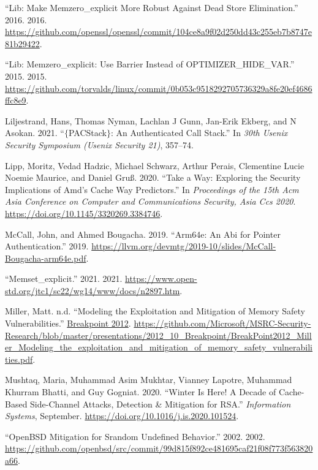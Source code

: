 \documentclass[a4paper,]{report}
\begin{document}
\leavevmode\hypertarget{ref-OpenSSLMemClr}{}%
``Lib: Make Memzero\_explicit More Robust Against Dead Store
Elimination.'' 2016. 2016.
\url{https://github.com/openssl/openssl/commit/104ce8a9f02d250dd43c255eb7b8747e81b29422}.

\leavevmode\hypertarget{ref-MemZeroBarrier}{}%
``Lib: Memzero\_explicit: Use Barrier Instead of OPTIMIZER\_HIDE\_VAR.''
2015. 2015.
\url{https://github.com/torvalds/linux/commit/0b053c9518292705736329a8fe20ef4686ffc8e9}.

\leavevmode\hypertarget{ref-Liljestrand2021}{}%
Liljestrand, Hans, Thomas Nyman, Lachlan J Gunn, Jan-Erik Ekberg, and N
Asokan. 2021. ``\(\{\)PACStack\(\}\): An Authenticated Call Stack.'' In
\emph{30th Usenix Security Symposium (Usenix Security 21)}, 357--74.

\leavevmode\hypertarget{ref-Lipp2020}{}%
Lipp, Moritz, Vedad Hadzic, Michael Schwarz, Arthur Perais, Clementine
Lucie Noemie Maurice, and Daniel Gruß. 2020. ``Take a Way: Exploring the
Security Implications of Amd's Cache Way Predictors.'' In
\emph{Proceedings of the 15th Acm Asia Conference on Computer and
Communications Security, Asia Ccs 2020}.
\url{https://doi.org/10.1145/3320269.3384746}.

\leavevmode\hypertarget{ref-McCall2019}{}%
McCall, John, and Ahmed Bougacha. 2019. ``Arm64e: An Abi for Pointer
Authentication.'' 2019.
\url{https://llvm.org/devmtg/2019-10/slides/McCall-Bougacha-arm64e.pdf}.

\leavevmode\hypertarget{ref-MemSetProposal}{}%
``Memset\_explicit.'' 2021. 2021.
\url{https://www.open-std.org/jtc1/sc22/wg14/www/docs/n2897.htm}.

\leavevmode\hypertarget{ref-Miller2012}{}%
Miller, Matt. n.d. ``Modeling the Exploitation and Mitigation of Memory
Safety Vulnerabilities.''
\href{https://2012.ruxconbreakpoint.com/}{Breakpoint 2012}.
\url{https://github.com/Microsoft/MSRC-Security-Research/blob/master/presentations/2012_10_Breakpoint/BreakPoint2012_Miller_Modeling_the_exploitation_and_mitigation_of_memory_safety_vulnerabilities.pdf}.

\leavevmode\hypertarget{ref-Mushtaq2020}{}%
Mushtaq, Maria, Muhammad Asim Mukhtar, Vianney Lapotre, Muhammad Khurram
Bhatti, and Guy Gogniat. 2020. ``Winter Is Here! A Decade of Cache-Based
Side-Channel Attacks, Detection \& Mitigation for RSA.''
\emph{Information Systems}, September.
\url{https://doi.org/10.1016/j.is.2020.101524}.

\leavevmode\hypertarget{ref-ObsdJunk}{}%
``OpenBSD Mitigation for Srandom Undefined Behavior.'' 2002. 2002.
\url{https://github.com/openbsd/src/commit/99d815f892ce481695caf21f08f773f563820a66}.
\end{document}
